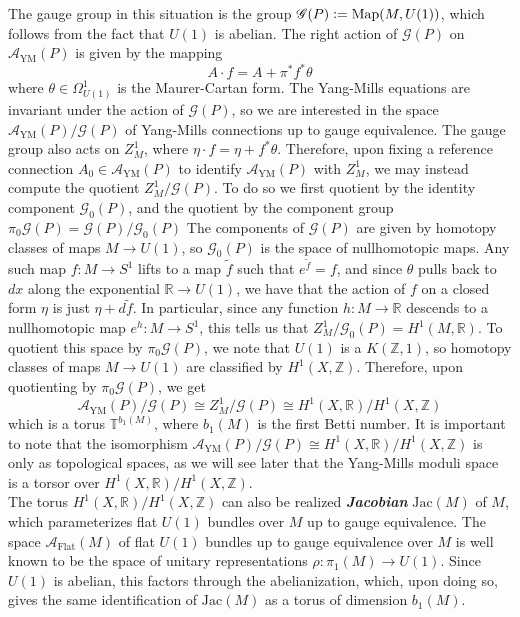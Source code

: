 \documentclass[psamsfonts, 12pt]{amsart}
\theoremstyle{definition}
\theoremstyle{remark}
\newcommand{\R}{\mathbb{R}}
\newcommand{\ib}[1]{\textbf{\textit{#1}}}
\newcommand{\Z}{\mathbb{Z}}
\newcommand{\defeq}{\vcentcolon=}
\begin{document}
The gauge group in this situation is the group
$\mathscr{G}(P) \defeq \mathrm{Map}(M,U(1))$, which follows from the fact that
$U(1)$ is abelian. The right action of $\mathscr{G}(P)$ on $\mathscr{A}_{\text{YM}}(P)$
is given by the mapping
\[
A \cdot f = A + \pi^*f^*\theta
\]
where $\theta \in \Omega^1_{U(1)}$ is the Maurer-Cartan form. The Yang-Mills
equations are invariant under the action of $\mathscr{G}(P)$, so we are interested
in the space $\mathscr{A}_{\text{YM}}(P) / \mathscr{G}(P)$ of Yang-Mills connections
up to gauge equivalence. The gauge group also acts on $Z^1_M$, where
$\eta \cdot f = \eta + f^*\theta$. Therefore, upon fixing a reference
connection $A_0 \in \mathscr{A}_{\text{YM}}(P)$ to identify $\mathscr{A}_{\text{YM}}(P)$
with $Z^1_M$, we may instead compute the quotient $Z^1_M / \mathscr{G}(P)$. To
do so we first quotient by the identity component $\mathscr{G}_0(P)$, and
the quotient by the component group $\pi_0\mathscr{G}(P) = \mathscr{G}(P)/\mathscr{G}_0(P)$
The components of $\mathscr{G}(P)$ are given by homotopy classes of maps
$M \to U(1)$, so $\mathscr{G}_0(P)$ is the space of nullhomotopic maps. Any such
map $f : M \to S^1$ lifts to a map $\tilde{f}$ such that $e^{\tilde{f}} = f$,
and since $\theta$ pulls back to $dx$ along the exponential $\R \to U(1)$, we have that
the action of $f$ on a closed form $\eta$ is just $\eta + d\tilde{f}$. In
particular, since any function $h : M \to \R$ descends to a nullhomotopic map
$e^h : M \to S^1$, this tells us that $Z^1_M / \mathscr{G}_0(P) = H^1(M,\R)$.
To quotient this space by $\pi_0\mathscr{G}(P)$, we note that $U(1)$ is a
$K(\Z,1)$, so homotopy classes of maps $M \to U(1)$ are classified by
$H^1(X,\Z)$. Therefore, upon quotienting by $\pi_0\mathscr{G}(P)$, we get
\[
\mathscr{A}_{\text{YM}}(P)/\mathscr{G}(P) \cong Z^1_M/\mathscr{G}(P)
\cong H^1(X,\R)/H^1(X,\Z)
\]
which is a torus $\mathbb{T}^{b_1(M)}$, where $b_1(M)$ is the first Betti number.
It is important to note that the isomorphism
$\mathscr{A}_{\text{YM}}(P)/\mathscr{G}(P) \cong H^1(X,\R)/H^1(X,\Z)$ is only
as topological spaces, as we will see later that the Yang-Mills moduli
space is a torsor over $H^1(X,\R)/H^1(X,\Z)$. \\

The torus $H^1(X,\R)/H^1(X,\Z)$ can also be realized \ib{Jacobian}
$\mathrm{Jac}(M)$ of $M$, which parameterizes flat $U(1)$ bundles over $M$ up to gauge
equivalence. The space $\mathscr{A}_{\text{Flat}}(M)$ of flat $U(1)$ bundles up to
gauge equivalence over $M$ is well known to be the space of unitary representations
$\rho : \pi_1(M) \to U(1)$. Since $U(1)$ is abelian, this factors through the
abelianization, which, upon doing so, gives the same identification of $\mathrm{Jac}(M)$
as a torus of dimension $b_1(M)$. \\
\end{document}
